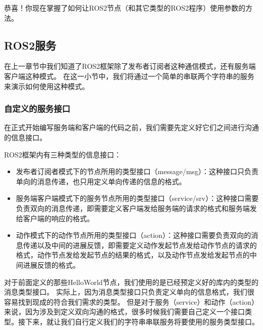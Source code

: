 \documentclass[letterpaper,10pt,english]{sphinxmanual}
\begin{document}
\sphinxAtStartPar
恭喜！你现在掌握了如何让ROS2节点（和其它类型的ROS2程序）使用参数的方法。


\subsection{ROS2服务}
\label{\detokenize{chapter_rl_sys/ros_code_ex:id9}}
\sphinxAtStartPar
在上一章节中我们知道了ROS2框架除了发布者\sphinxhyphen{}订阅者这种通信模式，还有服务端\sphinxhyphen{}客户端这种模式。
在这一小节中，我们将通过一个简单的串联两个字符串的服务来演示如何使用这种模式。


\subsubsection{自定义的服务接口}
\label{\detokenize{chapter_rl_sys/ros_code_ex:id10}}
\sphinxAtStartPar
在正式开始编写服务端和客户端的代码之前，我们需要先定义好它们之间进行沟通的信息接口。

\sphinxAtStartPar
ROS2框架内有三种类型的信息接口：
\begin{itemize}
\item {} 
\sphinxAtStartPar
发布者\sphinxhyphen{}订阅者模式下的节点所用的类型接口（message/msg）：这种接口只负责单向的消息传递，也只用定义单向传递的信息的格式。

\item {} 
\sphinxAtStartPar
服务端\sphinxhyphen{}客户端模式下的服务节点所用的类型接口（service/srv）：这种接口需要负责双向的消息传递，即需要定义客户端发给服务端的请求的格式和服务端发给客户端的响应的格式。

\item {} 
\sphinxAtStartPar
动作模式下的动作节点所用的类型接口（action）：这种接口需要负责双向的消息传递以及中间的进展反馈，即需要定义动作发起节点发给动作节点的请求的格式，动作节点发给发起节点的结果的格式，以及动作节点发给发起节点的中间进展反馈的格式。

\end{itemize}

\sphinxAtStartPar
对于前面定义的那些HelloWorld节点，我们使用的是已经预定义好的库内的类型的消息类型接口。
实际上，因为消息类型接口只负责定义单向的信息格式，我们很容易找到现成的符合我们需求的类型。
但是对于服务（service）和动作（action）来说，因为涉及到定义双向沟通的格式，很多时候我们需要自己定义一个接口类型。接下来，就让我们自行定义我们的字符串串联服务将要使用的服务类型接口。
\end{document}
